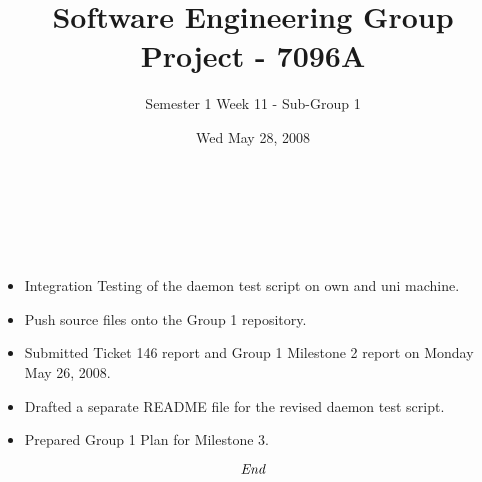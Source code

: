 \documentclass[10pt, a4]{article}
\begin{document}
 
\title{Software Engineering Group Project - 7096A}
\author{Semester 1 Week 11 - Sub-Group 1}
\date{Wed May 28, 2008}

\maketitle 

\\
 
\paragraph{}

\\

\begin{itemize}
\item Integration Testing of the daemon test script on own and uni machine.
\item Push source files onto the Group 1 repository.
\item Submitted Ticket 146 report and Group 1 Milestone 2 report on Monday May 26, 2008.
\item Drafted a separate README file for the revised daemon test script.
\item Prepared Group 1 Plan for Milestone 3.
\end{itemize}

\[\emph{End}\]
 
\end{document}
